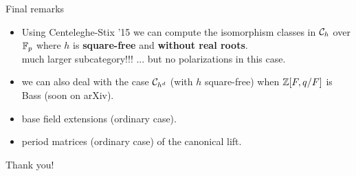 \documentclass{beamer}
\begin{document}
\begin{frame}{ Final remarks }
\begin{itemize}
         \item Using Centeleghe-Stix '15 we can compute the isomorphism classes in ${\mathcal C}_h$ over $\mathbb{F}_p$  where $h$ is \textbf{square-free} and \textbf{without real roots}.\\
\pause much larger subcategory!!! ... but no polarizations in this case.         
\pause   \item we can also deal with the case ${\mathcal C}_{h^d}$ (with $h$ square-free) when $\mathbb{Z}[F,q/F]$ is Bass (soon on arXiv).
\pause   \item base field extensions (ordinary case).
\pause   \item period matrices (ordinary case) of the canonical lift.
\end{itemize}
\end{frame}

\begin{frame}{ }
\begin{center}
{\Large Thank you!}
\end{center}
\end{frame}
\end{document}
